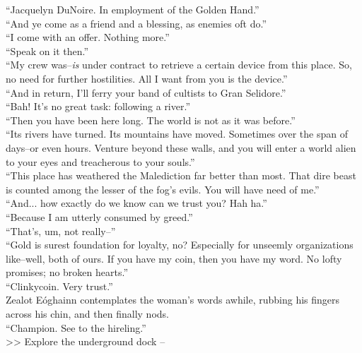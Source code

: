 “Jacquelyn DuNoire. In employment of the Golden Hand.”\\

“And ye come as a friend and a blessing, as enemies oft do.”\\

“I come with an offer. Nothing more.”\\

“Speak on it then.”\\

“My crew was--\emph{is} under contract to retrieve a certain device from this place. So, no need for further hostilities. All I want from you is the device.”\\

“And in return, I’ll ferry your band of cultists to Gran Selidore.”\\

“Bah! It’s no great task: following a river.”\\

“Then you have been here long. The world is not as it was before.”\\

“Its rivers have turned. Its mountains have moved. Sometimes over the span of days--or even hours. Venture beyond these walls, and you will enter a world alien to your eyes and treacherous to your souls.”\\

“This place has weathered the Malediction far better than most. That dire beast is counted among the lesser of the fog’s evils. You will have need of me.”\\

“And... how exactly do we know can we trust you? Hah ha.”\\

“Because I am utterly consumed by greed.”\\

“That’s, um, not really--”\\

“Gold is surest foundation for loyalty, no? Especially for unseemly organizations like--well, both of ours. If you have my coin, then you have my word. No lofty promises; no broken hearts.”\\

“Clinkycoin. Very trust.”\\

Zealot Eóghainn contemplates the woman’s words awhile, rubbing his fingers across his chin, and then finally nods.\\

“Champion. See to the hireling.”\\

>> Explore the underground dock -- 